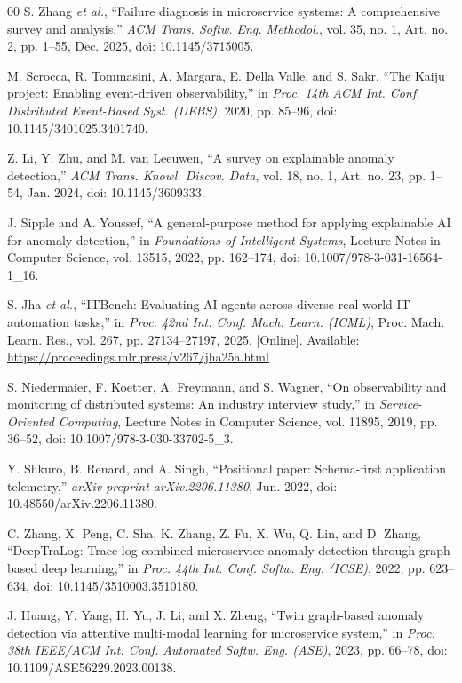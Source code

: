 \documentclass[conference]{IEEEtran}
\begin{document}
\begin{thebibliography}{00}
 S. Zhang \textit{et al.}, ``Failure diagnosis in microservice systems: A comprehensive survey and analysis,'' \textit{ACM Trans. Softw. Eng. Methodol.}, vol. 35, no. 1, Art. no. 2, pp. 1--55, Dec. 2025, doi: 10.1145/3715005.

 M. Scrocca, R. Tommasini, A. Margara, E. Della Valle, and S. Sakr, ``The Kaiju project: Enabling event-driven observability,'' in \textit{Proc. 14th ACM Int. Conf. Distributed Event-Based Syst. (DEBS)}, 2020, pp. 85--96, doi: 10.1145/3401025.3401740.

 Z. Li, Y. Zhu, and M. van Leeuwen, ``A survey on explainable anomaly detection,'' \textit{ACM Trans. Knowl. Discov. Data}, vol. 18, no. 1, Art. no. 23, pp. 1--54, Jan. 2024, doi: 10.1145/3609333.

 J. Sipple and A. Youssef, ``A general-purpose method for applying explainable AI for anomaly detection,'' in \textit{Foundations of Intelligent Systems}, Lecture Notes in Computer Science, vol. 13515, 2022, pp. 162--174, doi: 10.1007/978-3-031-16564-1\_16.

 S. Jha \textit{et al.}, ``ITBench: Evaluating AI agents across diverse real-world IT automation tasks,'' in \textit{Proc. 42nd Int. Conf. Mach. Learn. (ICML)}, Proc. Mach. Learn. Res., vol. 267, pp. 27134--27197, 2025. [Online]. Available: \url{https://proceedings.mlr.press/v267/jha25a.html}

 S. Niedermaier, F. Koetter, A. Freymann, and S. Wagner, ``On observability and monitoring of distributed systems: An industry interview study,'' in \textit{Service-Oriented Computing}, Lecture Notes in Computer Science, vol. 11895, 2019, pp. 36--52, doi: 10.1007/978-3-030-33702-5\_3.

 Y. Shkuro, B. Renard, and A. Singh, ``Positional paper: Schema-first application telemetry,'' \textit{arXiv preprint arXiv:2206.11380}, Jun. 2022, doi: 10.48550/arXiv.2206.11380.

 C. Zhang, X. Peng, C. Sha, K. Zhang, Z. Fu, X. Wu, Q. Lin, and D. Zhang, ``DeepTraLog: Trace-log combined microservice anomaly detection through graph-based deep learning,'' in \textit{Proc. 44th Int. Conf. Softw. Eng. (ICSE)}, 2022, pp. 623--634, doi: 10.1145/3510003.3510180.

 J. Huang, Y. Yang, H. Yu, J. Li, and X. Zheng, ``Twin graph-based anomaly detection via attentive multi-modal learning for microservice system,'' in \textit{Proc. 38th IEEE/ACM Int. Conf. Automated Softw. Eng. (ASE)}, 2023, pp. 66--78, doi: 10.1109/ASE56229.2023.00138.


\end{thebibliography}
\end{document}
